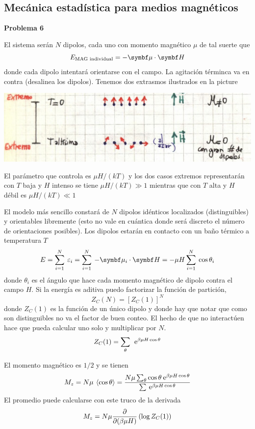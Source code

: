 \documentclass[10pt,oneside]{CBFT_book}
\begin{document}
\subsection{Mecánica estadística para medios magnéticos}

\begin{ejemplo}{\bf Problema 6}

El sistema serán $N$ dipolos, cada uno con momento magnético $\mu$ de tal suerte que 
\[
	E_{\text{MAG individual}} = - \vb{\mu} \cdot \vb{H}
\]
donde cada dipolo intentará orientarse con el campo.
La agitación términca va en contra (desalinea los dipolos). Tenemos dos extrasmos ilustrados
en la picture

\includegraphics[scale=0.5]{images/1606329484.jpg}

El parámetro que controla es $\mu H / (k T)$ y los dos casos extremos representarán 
con $T$ baja y $H$ intenso se tiene $\mu H / (k T) \gg 1$ mientras que con $T$ alta y $H$ débil 
es $\mu H / (k T) \ll 1 $

El modelo más sencillo constará de $N$ dipolos idénticos localizados (distinguibles) y orientables
libremente (esto no vale en cuántica donde será discreto el número de orientaciones posibles).
Los dipolos estarán en contacto con un baño térmico a temperatura $T$
\[
	E = \sum_{i=1}^N \: \vare_i = \sum_{i=1}^N \: -\vb{\mu}_i \cdot \vb{H} =
	- \mu H \sum_{i=1}^N \: \cos\theta_i
\]
donde $\theta_i$ es el ángulo que hace cada momento magnético de dipolo contra el campo $H$.
Si la energía es aditiva puedo factorizar la función de partición,
\[
	Z_C(N) =  [ Z_C(1) ]^N
\]
donde $Z_C(1)$ es la función de un único dipolo y donde hay que notar que como son distinguibles
no va el factor de buen conteo.
El hecho de que no interactúen hace que pueda calcular uno solo y multiplicar por $N$.
\[
	Z_C(1) = \sum_\theta \: \:\mathrm{e}^{\beta \mu H \cos \theta }
\]

El momento magnético es $1/2$ y se tienen
\[
	M_z = N \mu \:\left\langle  \cos \theta  \right\rangle = 
	\frac{ N \mu \sum_\theta \cos \theta \:\mathrm{e}^{ \beta \mu H \cos \theta} }
	{ \sum \:\mathrm{e}^{ \beta \mu H \cos \theta} }
\]
El promedio puede calcularse con este truco de la derivada
\[
	M_z = N \mu \frac{\partial^{\hspace{-0.05em}} {}}{\partial {(\beta \mu H)}^{\hspace{-0.05em}}}\left( \log Z_C(1) \right)
\]


\end{ejemplo}
\end{document}
